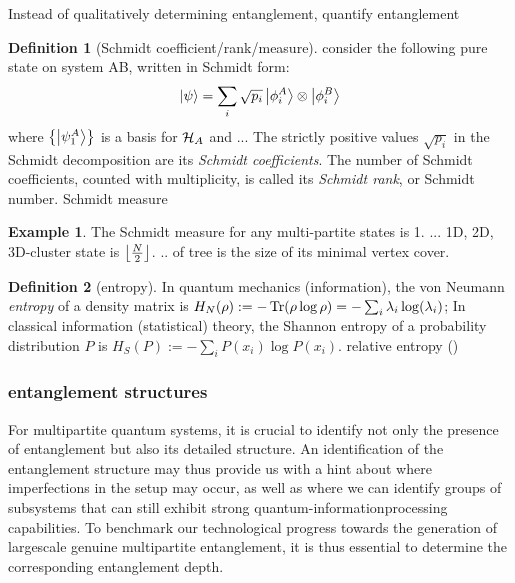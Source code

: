\documentclass[
10pt,
aps,
pra,
linenumbers,
floatfix,
]{revtex4-2}
\theoremstyle{plain}
\theoremstyle{definition}
\newtheorem{definition}{Definition}
\newtheorem{example}{Example}
\newtheorem{remark}{Remark}
\newcommand{\dm}{\rho}
\begin{document}
Instead of qualitatively determining entanglement, quantify entanglement
\begin{definition}[Schmidt coefficient/rank/measure]
	consider the following pure state on system AB, written in Schmidt form:
	\begin{equation}
		\ket{\psi} = \sum_i \sqrt{p_i} \ket{\phi_i^A}\otimes\ket{\phi_i^B}
	\end{equation}
	where $\qty{\ket{\psi_1^A}}$ is a basis for $\mathcal{H}_A$ and ...
	The strictly positive values $\sqrt{p_i}$ in the Schmidt decomposition are its \emph{Schmidt coefficients}. 
	The number of Schmidt coefficients, counted with multiplicity, is called its \emph{Schmidt rank}, or Schmidt number.
	Schmidt measure
\end{definition}
\begin{example}
	The Schmidt measure for any multi-partite  states is 1.
	... 1D, 2D, 3D-cluster state is $\left\lfloor \frac{N}{2} \right\rfloor$.
	.. of tree is the size of its minimal vertex cover.
\end{example}
\begin{definition}[entropy]\label{def:entropy}
	In quantum mechanics (information), the von Neumann \emph{entropy} of a density matrix is $H_N(\dm): = -\Tr(\dm \log \dm)=-\sum_i\lambda_i\log(\lambda_i)$;
	In classical information (statistical) theory, the Shannon entropy of a probability distribution $P$ is  $H_S(P):= -\sum_i P(x_i) \log P(x_i)$.
	relative entropy ()
\end{definition}

\subsubsection{entanglement structures}
For multipartite quantum systems, it is crucial to identify not only the presence of entanglement but also its detailed structure.
An identification of the entanglement structure may thus provide us with a hint about where imperfections in the setup may occur, as well as where we can identify groups of subsystems that can still exhibit strong quantum-informationprocessing capabilities.
To benchmark our technological progress towards the generation of largescale genuine multipartite entanglement, it is thus essential to determine the corresponding entanglement depth.
\end{document}
